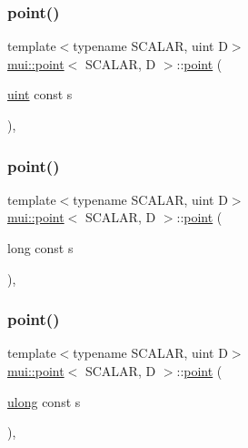 \mbox{\label{structmui_1_1point_adb4252fac3396a4c046dbd83f27ab2f7}} 
\subsubsection{\texorpdfstring{point()}{point()}\hspace{0.1cm}{\footnotesize\ttfamily [5/15]}}
{\footnotesize\ttfamily template$<$typename S\+C\+A\+L\+AR, uint D$>$ \\
\hyperlink{structmui_1_1point}{mui\+::point}$<$ S\+C\+A\+L\+AR, D $>$\+::\hyperlink{structmui_1_1point}{point} (\begin{DoxyParamCaption}\item[{\hyperlink{namespacemui_af15a3e7188a2117fb9965277bb0cacd2}{uint} const}]{s }\end{DoxyParamCaption})\hspace{0.3cm}{\ttfamily [inline]}, {\ttfamily [explicit]}}

\mbox{\label{structmui_1_1point_ada0fa5ed73ff6466bb4c1e1329034694}} 
\subsubsection{\texorpdfstring{point()}{point()}\hspace{0.1cm}{\footnotesize\ttfamily [6/15]}}
{\footnotesize\ttfamily template$<$typename S\+C\+A\+L\+AR, uint D$>$ \\
\hyperlink{structmui_1_1point}{mui\+::point}$<$ S\+C\+A\+L\+AR, D $>$\+::\hyperlink{structmui_1_1point}{point} (\begin{DoxyParamCaption}\item[{long const}]{s }\end{DoxyParamCaption})\hspace{0.3cm}{\ttfamily [inline]}, {\ttfamily [explicit]}}

\mbox{\label{structmui_1_1point_aeefa1c37118b31c8b95f029b30fccf17}} 
\subsubsection{\texorpdfstring{point()}{point()}\hspace{0.1cm}{\footnotesize\ttfamily [7/15]}}
{\footnotesize\ttfamily template$<$typename S\+C\+A\+L\+AR, uint D$>$ \\
\hyperlink{structmui_1_1point}{mui\+::point}$<$ S\+C\+A\+L\+AR, D $>$\+::\hyperlink{structmui_1_1point}{point} (\begin{DoxyParamCaption}\item[{\hyperlink{namespacemui_a9547f17257ee9191f5ca66284f9ca8ab}{ulong} const}]{s }\end{DoxyParamCaption})\hspace{0.3cm}{\ttfamily [inline]}, {\ttfamily [explicit]}}

